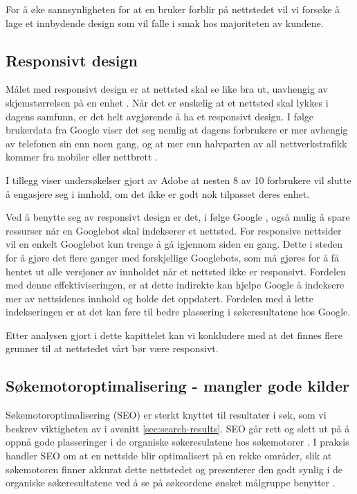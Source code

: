 For å øke sannsynligheten for at en bruker forblir på nettstedet vil vi forsøke å lage et innbydende design som vil falle i smak hos majoriteten av kundene.


\subsection{Responsivt design}
Målet med responsivt design er at nettsted skal se like bra ut, uavhengig av skjemstørrelsen på en enhet \cite{kim2013rwd}. Når det er ønskelig at et nettsted skal lykkes i dagens samfunn, er det helt avgjørende å ha et responsivt design.  I følge brukerdata fra Google \cite{google16hms} viser det seg nemlig at dagens forbrukere er mer avhengig av telefonen sin enn noen gang, og at mer enn halvparten av all nettverkstrafikk kommer fra mobiler eller nettbrett . 

I tillegg viser undersøkelser gjort av Adobe \cite{stark2015frf} at nesten 8 av 10 forbrukere vil slutte å engasjere seg i innhold, om det ikke er godt nok tilpasset deres enhet.

Ved å benytte seg av responsivt design er det, i følge Google \cite{google2018rwd}, også mulig å spare ressurser når en Googlebot skal indekserer et nettsted. For responsive nettsider vil en enkelt Googlebot kun trenge å gå igjennom siden en gang. Dette i steden for å gjøre det flere ganger med forskjellige Googlebots, som må gjøres for å få hentet ut alle versjoner av innholdet når et nettsted ikke er responsivt. Fordelen med denne effektiviseringen, er at dette indirekte kan hjelpe Google å indeksere mer av nettsidenes innhold og holde det oppdatert. Fordelen med å lette indekseringen er at det kan føre til bedre plassering i søkeresultatene hos Google.  

Etter analysen gjort i dette kapittelet kan vi konkludere med at det finnes flere grunner til at nettstedet vårt bør være responsivt.


\subsection{Søkemotoroptimalisering - mangler gode kilder}
\label{sec:concepts-seo}
Søkemotoroptimalisering (SEO) er sterkt knyttet til resultater i søk, som vi beskrev viktigheten av i avsnitt \ref{sec:search-results}. SEO går rett og slett ut på å oppnå gode plasseringer i de organiske søkeresulatene hos søkemotorer \cite[s.~16]{flensted10smg}. I praksis handler SEO om at en nettside blir optimalisert på en rekke områder, slik at søkemotoren finner akkurat dette nettstedet og presenterer den godt synlig i de organiske søkeresultatene ved å se på søkeordene ønsket målgruppe benytter \cite[s.~20]{flensted10smg}.

